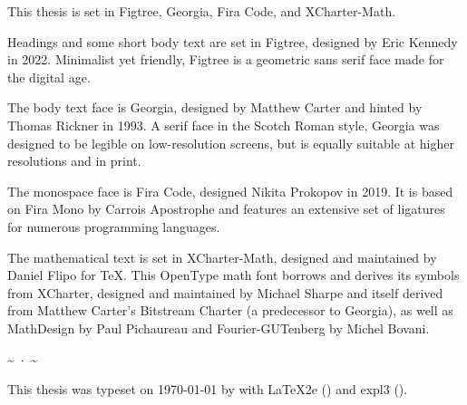 \documentclass[figtreepath=kthpq/fonts/Figtree/]{kthpq-thesis}
\def\mydinkus{\par\noindent\hfill\textasciitilde~$\cdot$~\textasciitilde\hfill\null\par}
\begin{document}
\begin{colophon}[.5\textwidth]%
\footnotesize
\setlength{\parindent}{1pc}
  \noindent This thesis is set in Figtree, Georgia, Fira Code, and XCharter-Math.

  Headings and some short body text are set in Figtree, designed by Eric Kennedy in 2022. Minimalist yet friendly, Figtree is a geometric sans serif face made for the digital age.

  The body text face is Georgia, designed by Matthew Carter and hinted by Thomas Rickner in 1993. A serif face in the Scotch Roman style, Georgia was designed to be legible on low-resolution screens, but is equally suitable at higher resolutions and in print.

  The monospace face is Fira Code, designed Nikita Prokopov in 2019. It is based on Fira Mono by Carrois Apostrophe and features an extensive set of ligatures for numerous programming languages.

  The mathematical text is set in XCharter-Math, designed and maintained by Daniel Flipo for \TeX. This OpenType math font borrows and derives its symbols from XCharter, designed and maintained by Michael Sharpe and itself derived from Matthew Carter's Bitstream Charter (a predecessor to Georgia), as well as MathDesign by Paul Pichaureau and Fourier-GUTenberg by Michel Bovani.

  \mydinkus

  \noindent This thesis was typeset on \today{} by \formattedluatexbanner{} with \LaTeX2e{} (\fmtversion) and \textsf{expl3} (\ExplLoaderFileDate).
\end{colophon}
\end{document}
